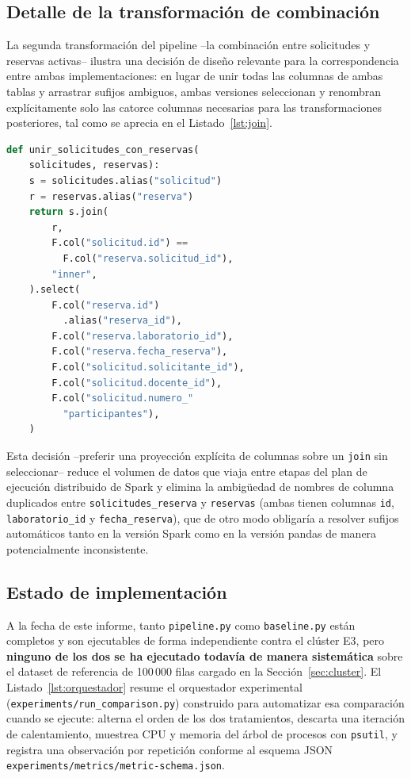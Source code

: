 \documentclass[10pt,twocolumn]{article}
\begin{document}
\subsection{Detalle de la transformación de combinación}

La segunda transformación del pipeline --la combinación entre solicitudes
y reservas activas-- ilustra una decisión de diseño relevante para la
correspondencia entre ambas implementaciones: en lugar de unir todas las
columnas de ambas tablas y arrastrar sufijos ambiguos, ambas versiones
seleccionan y renombran explícitamente solo las catorce columnas
necesarias para las transformaciones posteriores, tal como se aprecia en el
Listado~\ref{lst:join}.

\begin{lstlisting}[language=Python,caption={Combinación explícita de columnas en \texttt{pipeline.py}.},label={lst:join}]
def unir_solicitudes_con_reservas(
    solicitudes, reservas):
    s = solicitudes.alias("solicitud")
    r = reservas.alias("reserva")
    return s.join(
        r,
        F.col("solicitud.id") ==
          F.col("reserva.solicitud_id"),
        "inner",
    ).select(
        F.col("reserva.id")
          .alias("reserva_id"),
        F.col("reserva.laboratorio_id"),
        F.col("reserva.fecha_reserva"),
        F.col("solicitud.solicitante_id"),
        F.col("solicitud.docente_id"),
        F.col("solicitud.numero_"
          "participantes"),
    )
\end{lstlisting}

Esta decisión --preferir una proyección explícita de columnas sobre un
\texttt{join} sin seleccionar-- reduce el volumen de datos que viaja entre
etapas del plan de ejecución distribuido de Spark y elimina la ambigüedad
de nombres de columna duplicados entre \texttt{solicitudes\_reserva} y
\texttt{reservas} (ambas tienen columnas \texttt{id},
\texttt{laboratorio\_id} y \texttt{fecha\_reserva}), que de otro modo
obligaría a resolver sufijos automáticos tanto en la versión Spark como en
la versión pandas de manera potencialmente inconsistente.

\subsection{Estado de implementación}

A la fecha de este informe, tanto \texttt{pipeline.py} como
\texttt{baseline.py} están completos y son ejecutables de forma
independiente contra el clúster E3, pero \textbf{ninguno de los dos se ha
ejecutado todavía de manera sistemática} sobre el dataset de referencia de
100\,000 filas cargado en la Sección~\ref{sec:cluster}. El
Listado~\ref{lst:orquestador} resume el orquestador experimental
(\texttt{experiments/run\_comparison.py}) construido para automatizar esa
comparación cuando se ejecute: alterna el orden de los dos tratamientos,
descarta una iteración de calentamiento, muestrea CPU y memoria del árbol
de procesos con \texttt{psutil}, y registra una observación por repetición
conforme al esquema JSON \texttt{experiments/metrics/metric-schema.json}.
\end{document}
